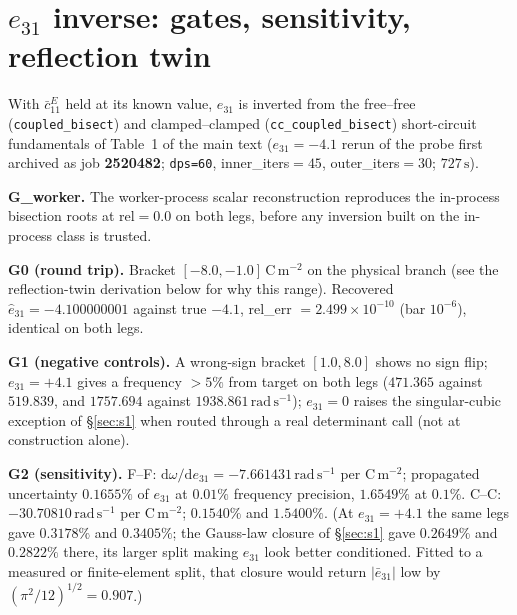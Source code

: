 \documentclass[11pt]{article}
\newcommand{\eebar}{\bar{e}_{31}}
\newcommand{\cbar}{\bar{c}_{11}^{E}}
\begin{document}
\section{$e_{31}$ inverse: gates, sensitivity, reflection twin}
\label{sec:s4}
With $\cbar$ held at its known value, $e_{31}$ is inverted from the
free--free (\texttt{coupled\_bisect}) and clamped--clamped
(\texttt{cc\_coupled\_bisect}) short-circuit fundamentals of
Table~1 of the main text ($e_{31}=-4.1$ rerun of the probe first
archived as job \textbf{2520482}; \texttt{dps=60}, inner\_iters$=45$,
outer\_iters$=30$; $727\,\mathrm{s}$).

\textbf{G\_worker.} The worker-process scalar reconstruction reproduces
the in-process bisection roots at rel$=0.0$ on both legs, before any
inversion built on the in-process class is trusted.

\textbf{G0 (round trip).} Bracket $[-8.0,-1.0]\,\mathrm{C\,m^{-2}}$ on
the physical branch (see the reflection-twin derivation below for why
this range). Recovered $\hat e_{31}=-4.100000001$ against true $-4.1$,
rel\_err $=2.499\times10^{-10}$ (bar $10^{-6}$), identical on both
legs.

\textbf{G1 (negative controls).} A wrong-sign bracket $[1.0,8.0]$ shows
no sign flip; $e_{31}=+4.1$ gives a frequency $>5\%$ from target on
both legs ($471.365$ against $519.839$, and $1757.694$ against
$1938.861\,\mathrm{rad\,s^{-1}}$); $e_{31}=0$ raises the singular-cubic
exception of \S\ref{sec:s1} when routed through a real determinant call
(not at construction alone).

\textbf{G2 (sensitivity).} F--F:
$\mathrm d\omega/\mathrm de_{31}=-7.661431\,\mathrm{rad\,s^{-1}}$ per
$\mathrm{C\,m^{-2}}$; propagated uncertainty $0.1655\%$ of $e_{31}$ at
$0.01\%$ frequency precision, $1.6549\%$ at $0.1\%$. C--C:
$-30.70810\,\mathrm{rad\,s^{-1}}$ per $\mathrm{C\,m^{-2}}$; $0.1540\%$
and $1.5400\%$. (At $e_{31}=+4.1$ the same legs gave $0.3178\%$ and
$0.3405\%$; the Gauss-law closure of \S\ref{sec:s1} gave $0.2649\%$ and
$0.2822\%$ there, its larger split making $e_{31}$ look better
conditioned. Fitted to a measured or finite-element split, that closure
would return $\lvert\eebar\rvert$ low by $(\pi^2/12)^{1/2}=0.907$.)
\end{document}
